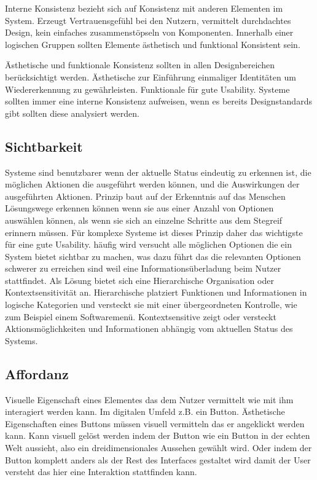Interne Konsistenz bezieht sich auf Konsistenz mit anderen Elementen im System. Erzeugt Vertrauensgefühl bei den Nutzern, vermittelt durchdachtes Design, kein einfaches zusammenstöpseln von Komponenten. Innerhalb einer logischen Gruppen sollten Elemente ästhetisch und funktional Konsistent sein.

Ästhetische und funktionale Konsistenz sollten in allen Designbereichen berücksichtigt werden.
Ästhetische zur Einführung einmaliger Identitäten um Wiedererkennung zu gewährleisten.
Funktionale für gute Usability.
Systeme sollten immer eine interne Konsistenz aufweisen, wenn es bereits Designstandards gibt sollten diese analysiert werden.
\cite{Lidwell.2010}

\subsection{Sichtbarkeit}
Systeme sind benutzbarer wenn der aktuelle Status eindeutig zu erkennen ist, die möglichen Aktionen die ausgeführt werden können, und die Auswirkungen der ausgeführten Aktionen.
Prinzip baut auf der Erkenntnis auf das Menschen Lösungswege erkennen können wenn sie aus einer Anzahl von Optionen auswählen können, als wenn sie sich an einzelne Schritte aus dem Stegreif erinnern müssen.
Für komplexe Systeme ist dieses Prinzip daher das wichtigste für eine gute Usability.
häufig wird versucht alle möglichen Optionen die ein System bietet sichtbar zu machen, was dazu führt das die relevanten Optionen schwerer zu erreichen sind weil eine Informationsüberladung beim Nutzer stattfindet.
Als Lösung bietet sich eine Hierarchische Organisation oder Kontextsensitivität an.
Hierarchische platziert Funktionen und Informationen in logische Kategorien und versteckt sie mit einer übergeordneten Kontrolle, wie zum Beispiel einem Softwaremenü.
Kontextsensitive zeigt oder versteckt Aktionsmöglichkeiten und Informationen abhängig vom aktuellen Status des Systems.
\cite{Lidwell.2010}

\subsection{Affordanz}
Visuelle Eigenschaft eines Elementes das dem Nutzer vermittelt wie mit ihm interagiert werden kann. Im digitalen Umfeld z.B. ein Button.
Ästhetische Eigenschaften eines Buttons müssen visuell vermitteln das er angeklickt werden kann.
Kann visuell gelöst werden indem der Button wie ein Button in der echten Welt aussieht, also ein dreidimensionales Aussehen gewählt wird.
Oder indem der Button komplett anders als der Rest des Interfaces gestaltet wird damit der User versteht das hier eine Interaktion stattfinden kann.\cite{Knight.2019c}

